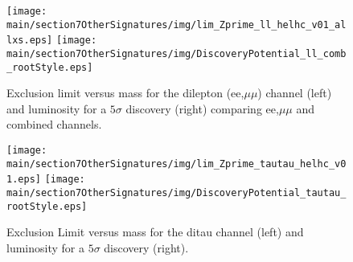   \begin{figure}[htbp]
  \centering
  \texttt{[image: \\main/section7OtherSignatures/img/lim\_Zprime\_ll\_helhc\_v01\_allxs.eps]}
  \texttt{[image: \\main/section7OtherSignatures/img/DiscoveryPotential\_ll\_comb\_rootStyle.eps]}
  \caption{Exclusion limit versus mass for the dilepton (ee,$\mu\mu$) channel (left) and luminosity for a $5\sigma$ discovery (right) comparing ee,$\mu\mu$ and combined channels. }
  \label{fig:leptonicresonances:resultsll}
\end{figure}

\begin{figure}[htbp]
  \centering
    \texttt{[image: \\main/section7OtherSignatures/img/lim\_Zprime\_tautau\_helhc\_v01.eps]}
    \texttt{[image: \\main/section7OtherSignatures/img/DiscoveryPotential\_tautau\_rootStyle.eps]}
  \caption{Exclusion  Limit versus mass for the ditau channel (left) and luminosity for a $5\sigma$ discovery (right). }
  \label{fig:leptonicresonances:resultstautau}
\end{figure}

